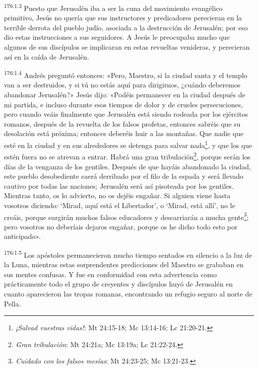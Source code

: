 \par
\textsuperscript{176:1.3} Puesto que Jerusalén iba a ser la cuna del movimiento evangélico primitivo, Jesús no quería que sus instructores y predicadores perecieran en la terrible derrota del pueblo judío, asociada a la destrucción de Jerusalén; por eso dio estas instrucciones a sus seguidores. A Jesús le preocupaba mucho que algunos de sus discípulos se implicaran en estas revueltas venideras, y perecieran así en la caída de Jerusalén.

\par
\textsuperscript{176:1.4} Andrés preguntó entonces: «Pero, Maestro, si la ciudad santa y el templo van a ser destruidos, y si tú no estás aquí para dirigirnos, ¿cuándo deberemos abandonar Jerusalén?» Jesús dijo: «Podéis permanecer en la ciudad después de mi partida, e incluso durante esos tiempos de dolor y de crueles persecuciones, pero cuando veáis finalmente que Jerusalén está siendo rodeada por los ejércitos romanos, después de la revuelta de los falsos profetas, entonces sabréis que su desolación está próxima; entonces deberéis huir a las montañas. Que nadie que esté en la ciudad y en sus alrededores se detenga para salvar nada\footnote{\textit{¡Salvad vuestras vidas!}: Mt 24:15-18; Mc 13:14-16; Lc 21:20-21.}, y que los que estén fuera no se atrevan a entrar. Habrá una gran tribulación\footnote{\textit{Gran tribulación}: Mt 24:21a; Mc 13:19a; Lc 21:22-24.}, porque serán los días de la venganza de los gentiles. Después de que hayáis abandonado la ciudad, este pueblo desobediente caerá derribado por el filo de la espada y será llevado cautivo por todas las naciones; Jerusalén será así pisoteada por los gentiles. Mientras tanto, os lo advierto, no os dejéis engañar. Si alguien viene hasta vosotros diciendo: `Mirad, aquí está el Libertador', o `Mirad, está allí', no le creáis, porque surgirán muchos falsos educadores y descarriarán a mucha gente\footnote{\textit{Cuidado con los falsos mesías}: Mt 24:23-25; Mc 13:21-23.}; pero vosotros no deberíais dejaros engañar, porque os he dicho todo esto por anticipado».

\par
\textsuperscript{176:1.5} Los apóstoles permanecieron mucho tiempo sentados en silencio a la luz de la Luna, mientras estas sorprendentes predicciones del Maestro se grababan en sus mentes confusas. Y fue en conformidad con esta advertencia como prácticamente todo el grupo de creyentes y discípulos huyó de Jerusalén en cuanto aparecieron las tropas romanas, encontrando un refugio seguro al norte de Pella.

